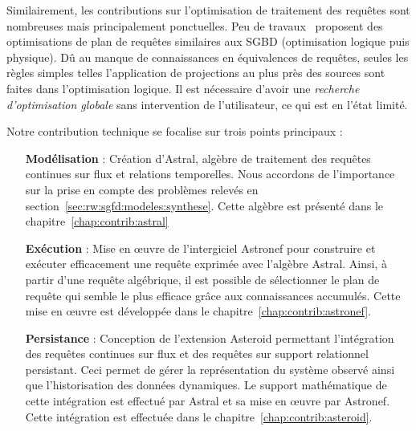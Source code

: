 Similairement, les contributions sur l'optimisation de traitement des requêtes sont nombreuses mais principalement ponctuelles. Peu de travaux~\cite{Galpin:snee,Kramer:semantics} proposent des optimisations de plan de requêtes similaires aux SGBD (optimisation logique puis physique). Dû au manque de connaissances en équivalences de requêtes, seules les règles simples telles l'application de projections au plus près des sources sont faites dans l'optimisation logique. Il est nécessaire d'avoir une \textit{recherche d'optimisation globale} sans intervention de l'utilisateur, ce qui est en l'état limité. 

Notre contribution technique se focalise sur trois points principaux :
\begin{itemize}
 \item[\textbf{Modélisation}] : Création d'Astral, algèbre de traitement des requêtes continues sur flux et relations temporelles. Nous accordons de l'importance sur la prise en compte des problèmes relevés en section~\ref{sec:rw:sgfd:modeles:synthese}. Cette algèbre est présenté dans le chapitre~\ref{chap:contrib:astral}
 \item[\textbf{Exécution}] : Mise en œuvre de l'intergiciel Astronef pour construire et exécuter efficacement une requête exprimée avec l'algèbre Astral. Ainsi, à partir d'une requête algébrique, il est possible de sélectionner le plan de requête qui semble le plus efficace grâce aux connaissances accumulés. Cette mise en œuvre est développée dans le chapitre~\ref{chap:contrib:astronef}.
 \item[\textbf{Persistance}] : Conception de l'extension Asteroid permettant l'intégration des requêtes continues sur flux et des requêtes sur support relationnel persistant. Ceci permet de gérer la représentation du système observé ainsi que l'historisation des données dynamiques. Le support mathématique de cette intégration est effectué par Astral et sa mise en œuvre par Astronef. Cette intégration est effectuée dans le chapitre~\ref{chap:contrib:asteroid}.
\end{itemize}

